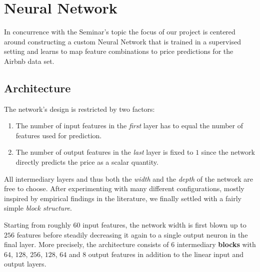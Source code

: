 \documentclass[12pt, letterpaper]{article}
\begin{document}
\section{Neural Network} \label{neural-network}

In concurrence with the Seminar's topic the focus of our project is centered around constructing a custom Neural Network that is trained in a supervised setting and learns to map feature combinations to price predictions for the Airbnb data set.

\subsection{Architecture}

The network's design is restricted by two factors:
\begin{enumerate}
    \item The number of input features in the \emph{first} layer has to equal the number of features used for prediction.
    \item The number of output features in the \emph{last} layer is fixed to $1$ since the network directly predicts the price as a scalar quantity.
\end{enumerate}
All intermediary layers and thus both the \emph{width} and the \emph{depth} of the network are free to choose.
After experimenting with many different configurations, mostly inspired by empirical findings in the literature, we finally settled with a fairly simple \emph{block structure}.

Starting from roughly $60$ input features, the network width is first blown up to $256$ features before steadily decreasing it again to a single output neuron in the final layer.
More precisely, the architecture consists of $6$ intermediary \textbf{blocks} with $64$, $128$, $256$, $128$, $64$ and $8$ output features in addition to the linear input and output layers.
\end{document}
